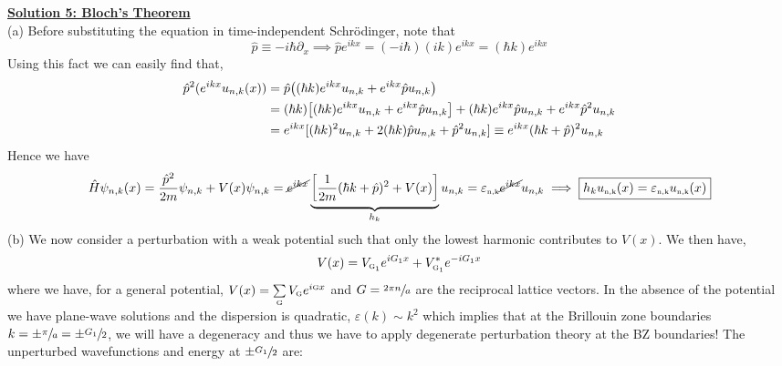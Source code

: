 \documentclass[usenames, svgnames, dvipsnames]{scrartcl}
\newcommand{\tund}[1]{_{\text{\tiny #1}}}
\begin{document}
    

\noindent
\underline{\textbf{{\sffamily Solution 5: Bloch's Theorem}}}
\\[0.3cm]
(a) Before substituting the equation in time-independent Schr{\"o}dinger, note that $$\hat{p}\equiv -i\hbar \partial_x \implies \hat{p}e^{ikx} = (-i\hbar) (ik) e^{ikx} = (\hbar k) e^{ikx}$$ Using this fact we can easily find that,
\begin{align*}
    \hat{p}^2 (e^{ikx} u_{n,k}(x)) &= \hat{p}\qty((\hbar k ) e^{ikx} u_{n,k} + e^{ikx}\hat{p}u_{n,k}) \\
    &=(\hbar k)\qty[(\hbar k)e^{ikx}u_{n,k} + e^{ikx} \hat{p}u_{n,k}] + (\hbar k)e^{ikx}\hat{p}u_{n,k} + e^{ikx} \hat{p}^2 u_{n,k}\\
    &=e^{ikx}[(\hbar k)^2 u_{n,k} + 2(\hbar k)\hat{p}u_{n,k} + \hat{p}^2 u_{n,k}] \equiv e^{ikx} (\hbar k + \hat{p})^2 u_{n,k}
\end{align*}
Hence we have 
\begin{align*}
    \hat{H} \psi_{n,k}(x) = \frac{\hat{p}^2}{2m}\psi_{n,k} + V(x)\psi_{n,k} =\cancel{e^{ikx}}\underbrace{\qty[ \frac{1}{2m}(\hbar k + \hat{p})^2+V(x)]}_{h_k} u_{n,k} = \varepsilon\tund{n,k} \cancel{e^{ikx}} u_{n,k} \implies \boxed{h_k u\tund{n,k}(x) = \varepsilon\tund{n,k}u\tund{n,k}(x)}
\end{align*}
(b) We now consider a perturbation with a weak potential such that only the lowest harmonic contributes to $V(x)$. We then have, 
\begin{align*}
    V(x) = V\tund{G\textsubscript{1}} e^{iG\textsubscript{\tiny 1} x}+V\tund{G\textsubscript{1}}^* e^{-iG\textsubscript{\tiny 1} x}
\end{align*}
where we have, for a general potential, $V(x) = \sum\limits_{\text{\tiny G}} V\tund{G}e^{i\text{\tiny G}x}$ and $G= \sfrac{2\pi n}{a}$ are the reciprocal lattice vectors. In the absence of the potential we have plane-wave solutions and the dispersion is quadratic, $\varepsilon(k)\sim k^2$ which implies that at the Brillouin zone boundaries $k = \pm \sfrac{\pi}{a} = \pm \sfrac{G\textsubscript{\tiny 1}}{2}$, we will have a degeneracy and thus we have to apply degenerate perturbation theory at the BZ boundaries! The unperturbed wavefunctions and energy at $ \pm \sfrac{G\textsubscript{\tiny 1}}{2} $ are: 
\end{document}
